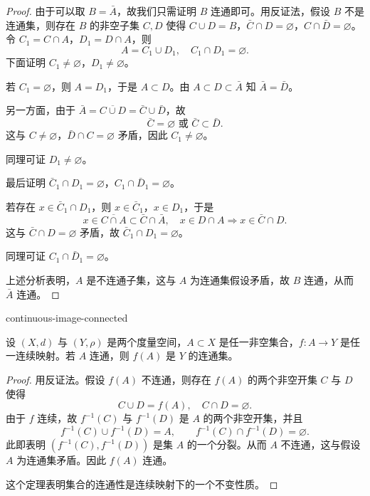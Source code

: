 \begin{proof}

由于可以取 $B=\bar{A}$，故我们只需证明 $B$ 连通即可。用反证法，假设 $B$ 不是连通集，则存在 $B$ 的非空子集 $C,D$ 使得 $C\cup D=B$，$\bar{C}\cap D=\varnothing$，$C\cap\bar{D}=\varnothing$。令 $C_1=C\cap A$，$D_1=D\cap A$，则
\[A=C_1\cup D_1,\quad C_1\cap D_1=\varnothing.\]
下面证明 $C_1\neq\varnothing$，$D_1\neq\varnothing$。

若 $C_1=\varnothing$，则 $A=D_1$，于是 $A\subset D$。由 $A\subset D\subset\bar{A}$ 知 $\bar{A}=\bar{D}$。

另一方面，由于 $\bar{A}=\overline{C\cup D}=\bar{C}\cup\bar{D}$，故
\[\bar{C}=\varnothing\text{ 或 }\bar{C}\subset\bar{D}.\]
这与 $C\neq\varnothing$，$\bar{D}\cap C=\varnothing$ 矛盾，因此 $C_1\neq\varnothing$。

同理可证 $D_1\neq\varnothing$。

最后证明 $\bar{C}_1\cap D_1=\varnothing$，$C_1\cap\bar{D}_1=\varnothing$。

若存在 $x\in\bar{C}_1\cap D_1$，则 $x\in\bar{C}_1$，$x\in D_1$，于是
\[x\in\overline{C\cap A}\subset\bar{C}\cap\bar{A},\quad x\in D\cap A\Longrightarrow x\in\bar{C}\cap D.\]
这与 $\bar{C}\cap D=\varnothing$ 矛盾，故 $\bar{C}_1\cap D_1=\varnothing$。

同理可证 $C_1\cap\bar{D}_1=\varnothing$。

上述分析表明，$A$ 是不连通子集，这与 $A$ 为连通集假设矛盾，故 $B$ 连通，从而 $\bar{A}$ 连通。

\end{proof}

\begin{mythm}{}{continuous-image-connected}

设 $(X,d)$ 与 $(Y,\rho)$ 是两个度量空间，$A\subset X$ 是任一非空集合，$f:A\to Y$ 是任一连续映射。若 $A$ 连通，则 $f(A)$ 是 $Y$ 的连通集。

\end{mythm}

\begin{proof}

用反证法。假设 $f(A)$ 不连通，则存在 $f(A)$ 的两个非空开集 $C$ 与 $D$ 使得
\[C\cup D=f(A),\quad C\cap D=\varnothing.\]
由于 $f$ 连续，故 $f^{-1}(C)$ 与 $f^{-1}(D)$ 是 $A$ 的两个非空开集，并且
\[f^{-1}(C)\cup f^{-1}(D)=A,\qquad f^{-1}(C)\cap f^{-1}(D)=\varnothing.\]
此即表明 $(f^{-1}(C),f^{-1}(D))$ 是集 $A$ 的一个分裂。从而 $A$ 不连通，这与假设 $A$ 为连通集矛盾。因此 $f(A)$ 连通。

这个定理表明集合的连通性是连续映射下的一个不变性质。

\end{proof}

